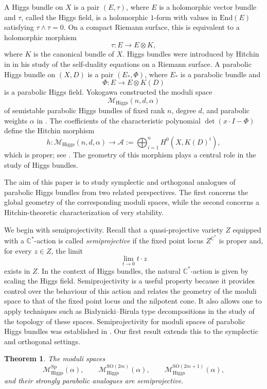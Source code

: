 \documentclass[11pt, reqno]{amsart}
\numberwithin{equation}{section}
\newcommand{\Sp}{\mathrm{Sp}}
\newcommand{\SO}{\mathrm{SO}}
\newcommand{\Higgs}{\mathrm{Higgs}}
\newcommand{\End}{\mathrm{End}}
\newtheorem{theorem}{Theorem}[section]
\theoremstyle{definition}
\begin{document}
A Higgs bundle on $X$ is a pair $(E,\tau)$, where $E$ is a holomorphic vector bundle and $\tau$, called the Higgs field, is a holomorphic $1$-form with values in $\End(E)$ satisfying $\tau \wedge \tau =0$. On a compact Riemann surface, this is equivalent to a holomorphic morphism
\[
\tau:E\longrightarrow E\otimes K,
\]
where $K$ is the canonical bundle of $X$. Higgs bundles were introduced by Hitchin in \cite{H87a} in his study of the self-duality equations on a Riemann surface. A parabolic Higgs bundle on $(X,D)$ is a pair $(E_*,\Phi)$, where $E_*$ is a parabolic bundle and
\[
\Phi:E\longrightarrow E\otimes K(D)
\]
is a parabolic Higgs field. Yokogawa constructed the moduli space
\[
\mathcal{M}_{\Higgs}(n,d,\alpha)
\]
of semistable parabolic Higgs bundles of fixed rank $n$, degree $d$, and parabolic weights $\alpha$ in \cite{Y93}. The coefficients of the characteristic polynomial $\det(x\cdot I-\Phi)$ define the Hitchin morphism
\[
h:\mathcal{M}_{\Higgs}(n,d,\alpha)\longrightarrow \mathcal{A}:=\bigoplus_{i=1}^{n}H^0(X,K(D)^i),
\]
which is proper; see \cite{N91,M94}. The geometry of this morphism plays a central role in the study of Higgs bundles.

The aim of this paper is to study symplectic and orthogonal analogues of parabolic Higgs bundles from two related perspectives. The first concerns the global geometry of the corresponding moduli spaces, while the second concerns a Hitchin-theoretic characterization of very stability.

We begin with semiprojectivity. Recall that a quasi-projective variety $Z$ equipped with a $\mathbb{C}^*$-action is called \textit{semiprojective} if the fixed point locus $Z^{\mathbb{C}^*}$ is proper and, for every $z\in Z$, the limit
\[
\lim_{t\to 0} t\cdot z
\]
exists in $Z$. In the context of Higgs bundles, the natural $\mathbb{C}^*$-action is given by scaling the Higgs field. Semiprojectivity is a useful property because it provides control over the behaviour of this action and relates the geometry of the moduli space to that of the fixed point locus and the nilpotent cone. It also allows one to apply techniques such as Bia{\l}ynicki--Birula type decompositions in the study of the topology of these spaces. Semiprojectivity for moduli spaces of parabolic Higgs bundles was established in \cite{R24}. Our first result extends this to the symplectic and orthogonal settings.

\begin{theorem}
The moduli spaces
\[
\mathcal{M}^{\Sp}_{\Higgs}(\alpha),\qquad
\mathcal{M}^{\SO(2m)}_{\Higgs}(\alpha),\qquad
\mathcal{M}^{\SO(2m+1)}_{\Higgs}(\alpha),
\]
and their strongly parabolic analogues are semiprojective.
\end{theorem}
\end{document}
